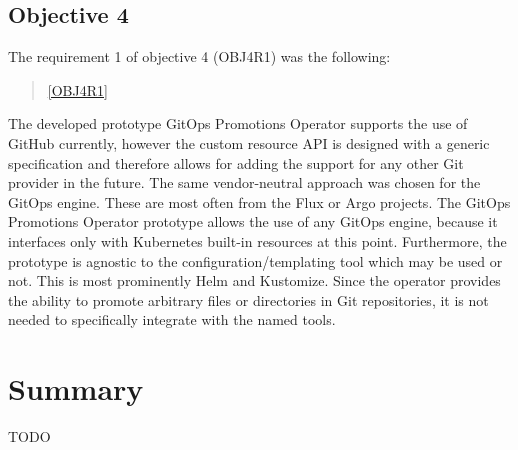 \subsection*{Objective 4}

The requirement 1 of objective 4 (OBJ4R1) was the following:

\begin{quotation}
	\noindent
	\ref{OBJ4R1}
\end{quotation}

The developed prototype GitOps Promotions Operator supports the use of GitHub currently,
however the custom resource API is designed with a generic specification and therefore allows
for adding the support for any other Git provider in the future.
The same vendor-neutral approach was chosen for the GitOps engine.
These are most often from the Flux or Argo projects.
The GitOps Promotions Operator prototype allows the use of any GitOps engine,
because it interfaces only with Kubernetes built-in resources at this point.
Furthermore, the prototype is agnostic to the configuration/templating tool which may be used or not.
This is most prominently Helm and Kustomize. Since the operator provides the ability
to promote arbitrary files or directories in Git repositories, it is not needed to specifically integrate
with the named tools.






\section{Summary}

TODO






